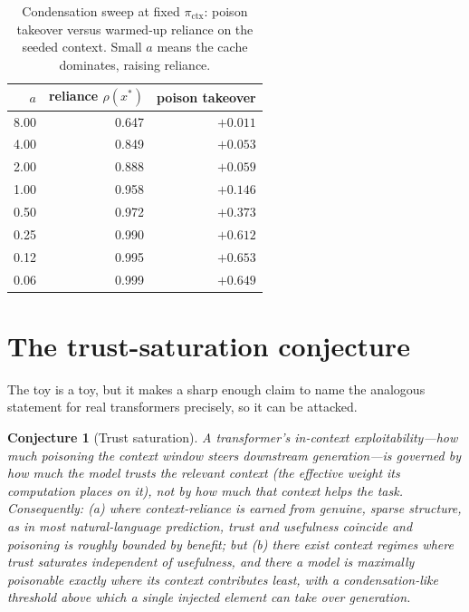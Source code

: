 \documentclass[11pt]{article}
\theoremstyle{plain}
\newtheorem{conjecture}{Conjecture}
\theoremstyle{definition}
\theoremstyle{remark}
\newcommand{\pictx}{\pi_{\text{ctx}}}
\newcommand{\xstar}{x^{\!*}}
\begin{document}
\begin{table}[h]
\centering\small
\caption{Condensation sweep at fixed $\pictx$: poison takeover versus warmed-up reliance on
the seeded context. Small $a$ means the cache dominates, raising reliance.}
\label{tab:cond}
\begin{tabular}{rrr}
\toprule
$a$ & reliance $\rho(\xstar)$ & poison takeover \\
\midrule
8.00 & 0.647 & $+0.011$ \\
4.00 & 0.849 & $+0.053$ \\
2.00 & 0.888 & $+0.059$ \\
1.00 & 0.958 & $+0.146$ \\
0.50 & 0.972 & $+0.373$ \\
0.25 & 0.990 & $+0.612$ \\
0.12 & 0.995 & $+0.653$ \\
0.06 & 0.999 & $+0.649$ \\
\bottomrule
\end{tabular}
\end{table}

\section{The trust-saturation conjecture}\label{sec:conjecture}
The toy is a toy, but it makes a sharp enough claim to name the analogous statement for real
transformers precisely, so it can be attacked.

\begin{conjecture}[Trust saturation]
A transformer's in-context exploitability---how much poisoning the context window steers
downstream generation---is governed by how much the model \emph{trusts} the relevant context
(the effective weight its computation places on it), not by how much that context helps the
task. Consequently: \textup{(a)} where context-reliance is earned from genuine, sparse
structure, as in most natural-language prediction, trust and usefulness coincide and
poisoning is roughly bounded by benefit; but \textup{(b)} there exist context regimes where
trust saturates independent of usefulness, and there a model is maximally poisonable exactly
where its context contributes least, with a condensation-like threshold above which a single
injected element can take over generation.
\end{conjecture}
\end{document}
